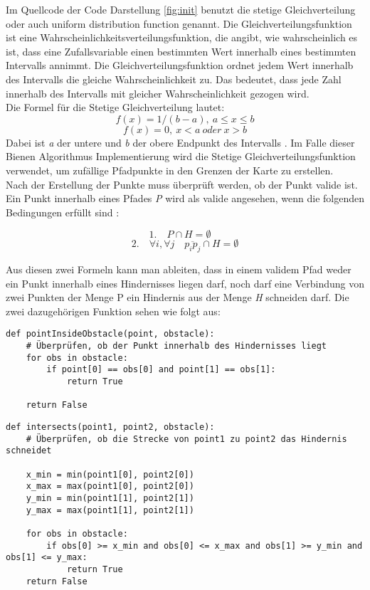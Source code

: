Im Quellcode der Code Darstellung \ref{fig:init} benutzt die stetige Gleichverteilung oder auch uniform distribution function genannt. Die Gleichverteilungsfunktion ist eine Wahrscheinlichkeitsverteilungsfunktion, die angibt, wie wahrscheinlich es ist, dass eine Zufallsvariable einen bestimmten Wert innerhalb eines bestimmten Intervalls annimmt.
Die Gleichverteilungsfunktion ordnet jedem Wert innerhalb des Intervalls die gleiche Wahrscheinlichkeit zu. Das bedeutet, dass jede Zahl innerhalb des Intervalls mit gleicher Wahrscheinlichkeit gezogen wird.\\
Die Formel für die Stetige Gleichverteilung lautet:
\[f(x) = 1/(b-a),\: a \leq x \leq b\]
\[f(x) = 0,\:x < a \:oder\: x > b\]
Dabei ist \emph{a} der untere und \emph{b} der obere Endpunkt des Intervalls \cite{casella2021statistical}. Im Falle dieser Bienen Algorithmus Implementierung wird die Stetige Gleichverteilungsfunktion verwendet, um zufällige Pfadpunkte in den Grenzen der Karte zu erstellen.\\
Nach der Erstellung der Punkte muss überprüft werden, ob der Punkt valide ist. Ein Punkt innerhalb eines Pfades \emph{P} wird als valide angesehen, wenn die folgenden Bedingungen erfüllt sind \cite{Darwish2018}:

\[1. \quad P \cap H = \emptyset \quad\]
\[2. \quad \forall i, \forall j \quad \overline{p_i p_j} \cap H = \emptyset\]

Aus diesen zwei Formeln kann man ableiten, dass in einem validem Pfad weder ein Punkt innerhalb eines Hindernisses liegen darf, noch darf eine Verbindung von zwei Punkten der Menge P ein Hindernis aus der Menge \emph{H} schneiden darf.
Die zwei dazugehörigen Funktion sehen wie folgt aus:

\begin{verbatim}
def pointInsideObstacle(point, obstacle):
    # Überprüfen, ob der Punkt innerhalb des Hindernisses liegt
    for obs in obstacle:
        if point[0] == obs[0] and point[1] == obs[1]:
            return True
                
    return False
\end{verbatim}
\vspace*{-3mm}
\vspace*{3mm}

\begin{verbatim}
def intersects(point1, point2, obstacle):
    # Überprüfen, ob die Strecke von point1 zu point2 das Hindernis schneidet

    x_min = min(point1[0], point2[0])
    x_max = max(point1[0], point2[0])
    y_min = min(point1[1], point2[1])
    y_max = max(point1[1], point2[1])

    for obs in obstacle:
        if obs[0] >= x_min and obs[0] <= x_max and obs[1] >= y_min and obs[1] <= y_max:
            return True
    return False
\end{verbatim}
\vspace*{-3mm}
\vspace*{3mm}

